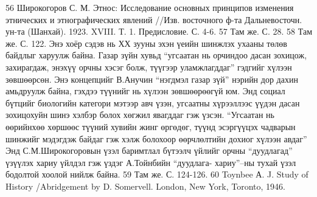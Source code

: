 56 Широкогоров С. М. Этнос: Исследование основных принципов изменения этнических и этнографических явлений //Изв. восточного ф-та Дальневосточн. ун-та (Шанхай). 1923. XVIII. Т. 1. Предисловие. С. 4-6.
57 Там же. С. 28.
58 Там же. С. 122.
Энэ хоёр сэдэв нь ХХ зууны эхэн үеийн шинжлэх ухааны төлөв байдлыг харуулж байна. Газар зүйн хувьд “угсаатан нь орчиндоо дасан зохицож, захирагдаж, энэхүү орчны хэсэг болж, түүгээр уламжлагддаг” гэдгийг хүлээн зөвшөөрсөн. Энэ концепцийг В.Анучин “нэгдмэл газар зүй” нэрийн дор дахин амьдруулж байна, гэхдээ түүнийг нь хүлээн зөвшөөрөөгүй юм. Энд социал бүтцийг биологийн категори мэтээр авч үзэн, угсаатны хүрээллээс үүдэн дасан зохицохуйн шинэ хэлбэр болох хөгжил явагддаг гэж үзсэн. “Угсаатан нь өөрийнхөө хөршөөс түүний хувийн жинг өргөдөг, түүнд эсэргүүцэх чадварын шинжийг мэдэгдэж байдаг гэж хэлж болохоор өөрчлөлтийн дохиог хүлээн авдаг” Энд С.М.Широкогоровын үзэл баримтлал бүтээлч үйлийг орчны “дуудлагад” үзүүлэх хариу үйлдэл гэж үздэг А.Тойнбийн “дуудлага- хариу”–ны тухай үзэл бодолтой хоолой нийлж байна.
59 Там же. С. 124-126.
60 Toynbee А. J. Study of History /Abridgement by D. Somervell. London, New York, Toronto, 1946.

